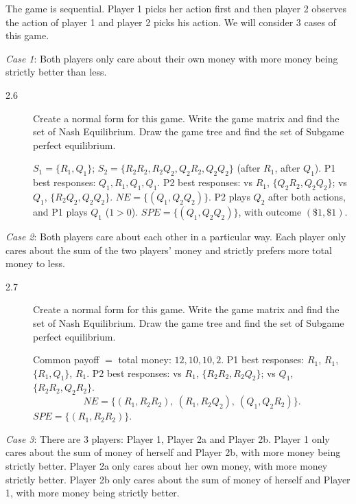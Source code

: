 The game is sequential. Player 1 picks her action first and then player 2 observes the action of player 1 and player 2 picks his action. We will consider 3 cases of this game.

\emph{Case 1}: Both players only care about their own money with more money being strictly better than less.

\begin{description}
\item[2.6] Create a normal form for this game. Write the game matrix and find the set of Nash Equilibrium. Draw the game tree and find the set of Subgame perfect equilibrium.
\begin{solution}
$S_1=\{R_1,Q_1\}$; $S_2=\{R_2R_2,R_2Q_2,Q_2R_2,Q_2Q_2\}$ (after $R_1$, after $Q_1$).
P1 best responses: $Q_1,R_1,Q_1,Q_1$. P2 best responses: vs $R_1$, $\{Q_2R_2,Q_2Q_2\}$; vs $Q_1$, $\{R_2Q_2,Q_2Q_2\}$. $NE=\{(Q_1,Q_2Q_2)\}$.
P2 plays $Q_2$ after both actions, and P1 plays $Q_1$ ($1>0$). $SPE=\{(Q_1,Q_2Q_2)\}$, with outcome $(\$1,\$1)$.
\end{solution}
\end{description}

\emph{Case 2}: Both players care about each other in a particular way. Each player only cares about the sum of the two players' money and strictly prefers more total money to less.

\begin{description}
\item[2.7] Create a normal form for this game. Write the game matrix and find the set of Nash Equilibrium. Draw the game tree and find the set of Subgame perfect equilibrium.
\begin{solution}
Common payoff $=$ total money: $12,10,10,2$.
P1 best responses: $R_1$, $R_1$, $\{R_1,Q_1\}$, $R_1$. P2 best responses: vs $R_1$, $\{R_2R_2,R_2Q_2\}$; vs $Q_1$, $\{R_2R_2,Q_2R_2\}$.
\[NE=\{(R_1,R_2R_2),\ (R_1,R_2Q_2),\ (Q_1,Q_2R_2)\}.\]
$SPE=\{(R_1,R_2R_2)\}$.
\end{solution}
\end{description}

\emph{Case 3}: There are 3 players: Player 1, Player 2a and Player 2b. Player 1 only cares about the sum of money of herself and Player 2b, with more money being strictly better. Player 2a only cares about her own money, with more money strictly better. Player 2b only cares about the sum of money of herself and Player 1, with more money being strictly better.

